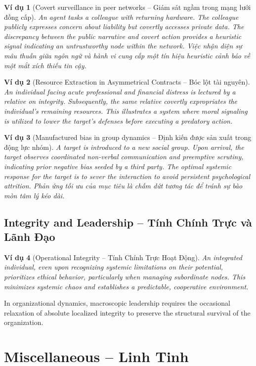 \documentclass{report}
\newtheorem{vidu}{Ví dụ}
\begin{document}
\begin{vidu}[Covert surveillance in peer networks -- Giám sát ngầm trong mạng lưới đồng cấp]
    An agent tasks a colleague with returning hardware. The colleague publicly expresses concern about liability but covertly accesses private data. The discrepancy between the public narrative and covert action provides a heuristic signal indicating an untrustworthy node within the network. Việc nhận diện sự mâu thuẫn giữa ngôn ngữ và hành vi cung cấp một tín hiệu heuristic cảnh báo về một mắt xích thiếu tin cậy.
\end{vidu}

\begin{vidu}[Resource Extraction in Asymmetrical Contracts -- Bóc lột tài nguyên]
    An individual facing acute professional and financial distress is lectured by a relative on integrity. Subsequently, the same relative covertly expropriates the individual's remaining resources. This illustrates a system where moral signaling is utilized to lower the target's defenses before executing a predatory action.
\end{vidu}

\begin{vidu}[Manufactured bias in group dynamics -- Định kiến được sản xuất trong động lực nhóm]
    A target is introduced to a new social group. Upon arrival, the target observes coordinated non-verbal communication and preemptive scrutiny, indicating prior negative bias seeded by a third party. The optimal systemic response for the target is to sever the interaction to avoid persistent psychological attrition. Phản ứng tối ưu của mục tiêu là chấm dứt tương tác để tránh sự bào mòn tâm lý kéo dài.
\end{vidu}

\section{Integrity and Leadership -- Tính Chính Trực và Lãnh Đạo}

\begin{vidu}[Operational Integrity -- Tính Chính Trực Hoạt Động]
    An integrated individual, even upon recognizing systemic limitations on their potential, prioritizes ethical behavior, particularly when managing subordinate nodes. This minimizes systemic chaos and establishes a predictable, cooperative environment.
\end{vidu}
In organizational dynamics, macroscopic leadership requires the occasional relaxation of absolute localized integrity to preserve the structural survival of the organization.


\chapter{Miscellaneous -- Linh Tinh}


\printbibliography[heading=bibintoc]
	
\end{document}
